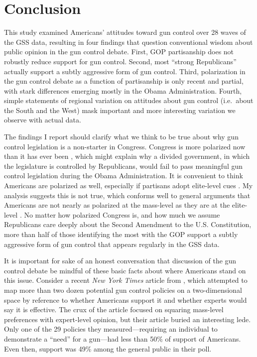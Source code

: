 \documentclass[11pt,]{article}
\begin{document}
\section{Conclusion}\label{conclusion}

This study examined Americans' attitudes toward gun control over 28
waves of the GSS data, resulting in four findings that question
conventional wisdom about public opinion in the gun control debate.
First, GOP partisanship does not robustly reduce support for gun
control. Second, most ``strong Republicans'' actually support a subtly
aggressive form of gun control. Third, polarization in the gun control
debate as a function of partisanship is only recent and partial, with
stark differences emerging mostly in the Obama Administration. Fourth,
simple statements of regional variation on attitudes about gun control
(i.e.~about the South and the West) mask important and more interesting
variation we observe with actual data.

The findings I report should clarify what we think to be true about why
gun control legislation is a non-starter in Congress. Congress is more
polarized now than it has ever been \citep[e.g.][]{andrisetal2015rpsc},
which might explain why a divided government, in which the legislature
is controlled by Republicans, would fail to pass meaningful gun control
legislation during the Obama Administration. It is convenient to think
Americans are polarized as well, especially if partisans adopt
elite-level cues \citep[c.f.][]{zaller1992nomo}. My analysis suggests
this is not true, which conforms well to general arguments that
Americans are not nearly as polarized at the mass-level as they are at
the elite-level \citep[e.g.][]{hilltausanovitch2015dr}. No matter how
polarized Congress is, and how much we assume Republicans care deeply
about the Second Amendment to the U.S. Constitution, more than half of
those identifying the most with the GOP support a subtly aggressive form
of gun control that appears regularly in the GSS data.

It is important for sake of an honest conversation that discussion of
the gun control debate be mindful of these basic facts about where
Americans stand on this issue. Consider a recent \emph{New York Times}
article from \citet{buisangerkatz2017hpgd}, which attempted to map more
than two dozen potential gun control policies on a two-dimensional space
by reference to whether Americans support it and whether experts would
say it is effective. The crux of the article focused on squaring
mass-level preferences with expert-level opinion, but their article
buried an interesting lede. Only one of the 29 policies they
measured---requiring an individual to demonstrate a ``need'' for a
gun---had less than 50\% of support of Americans. Even then, support was
49\% among the general public in their poll.
\end{document}
